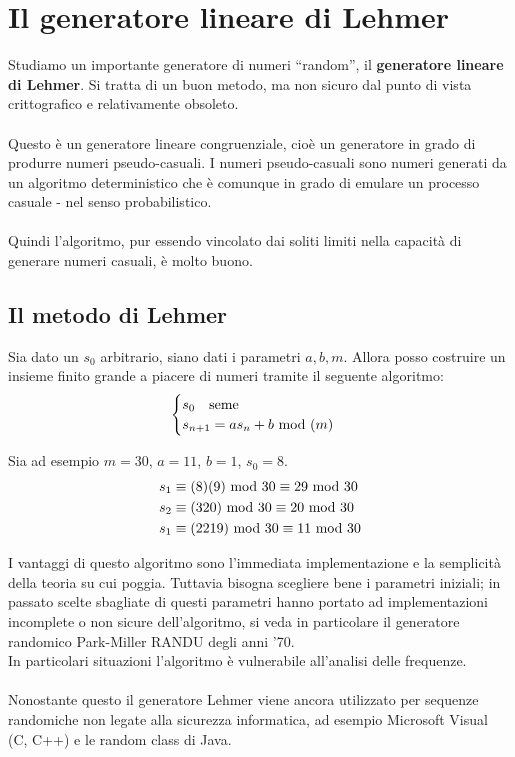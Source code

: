 \chapter{Il generatore lineare di Lehmer}
Studiamo un importante generatore di numeri \enquote{random}, il \textbf{generatore lineare di Lehmer}. Si tratta di un buon metodo, ma non sicuro dal punto di vista crittografico e relativamente obsoleto. \\ \\ Questo è un generatore lineare congruenziale, cioè un generatore in grado di produrre numeri pseudo-casuali. I numeri pseudo-casuali sono numeri generati da un algoritmo deterministico che è comunque in grado di emulare un processo casuale - nel senso probabilistico. \\ \\ Quindi l'algoritmo, pur essendo vincolato dai soliti limiti nella capacità di generare numeri casuali, è molto buono.
\section{Il metodo di Lehmer}
Sia dato un $s_0$ arbitrario, siano dati i parametri $a,b,m$. Allora posso costruire un insieme finito grande a piacere di numeri tramite il seguente algoritmo:
\begin{equation*}
\begin{cases}
s_0 \ \ \ \text{seme}\\
s_{n+1}=as_n+b\ \mathrm{mod}\ (m)
\end{cases}
\end{equation*}
\begin{esempio}
	Sia ad esempio $m=30$, $a=11$, $b=1$, $s_0=8$.
	\begin{align*}
	s_1&\equiv(8)(9)\ \mathrm{mod}\ 30\equiv29\ \mathrm{mod}\ 30\\
	s_2&\equiv(320)\ \mathrm{mod}\ 30\equiv20\ \mathrm{mod}\ 30\\
	s_1&\equiv(2219)\ \mathrm{mod}\ 30\equiv11\ \mathrm{mod}\ 30
	\end{align*}
\end{esempio}
I vantaggi di questo algoritmo sono l'immediata implementazione e la semplicità della teoria su cui poggia. Tuttavia bisogna scegliere bene i parametri iniziali; in passato scelte sbagliate di questi parametri hanno portato ad implementazioni incomplete o non sicure dell'algoritmo, si veda in particolare il generatore randomico Park-Miller \textsf{RANDU} degli anni '70. \\ In particolari situazioni l'algoritmo è vulnerabile all'analisi delle frequenze. \\ \\ Nonostante questo il generatore Lehmer viene ancora utilizzato per sequenze randomiche non legate alla sicurezza informatica, ad esempio \textsf{Microsoft Visual} (C, C++) e le random class di \textsf{Java}.

